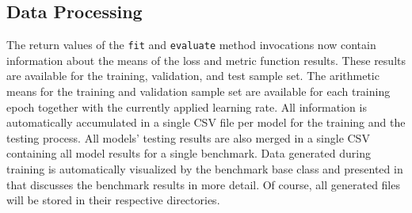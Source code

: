 \documentclass[draft,final]{vutinfth} %
\begin{document}
    \subsection{Data Processing} \label{benchmark_data}
    The return values of the \texttt{fit} and \texttt{evaluate} method invocations now contain information about the means of the loss and metric function results. These results are available for the training, validation, and test sample set.
    The arithmetic means for the training and validation sample set are available for each training epoch together with the currently applied learning rate.
    All information is automatically accumulated in a single CSV file per model for the training and the testing process.
    All models' testing results are also merged in a single CSV containing all model results for a single benchmark.
    Data generated during training is automatically visualized by the benchmark base class and presented in  that discusses the benchmark results in more detail.
    Of course, all generated files will be stored in their respective directories.
\end{document}
